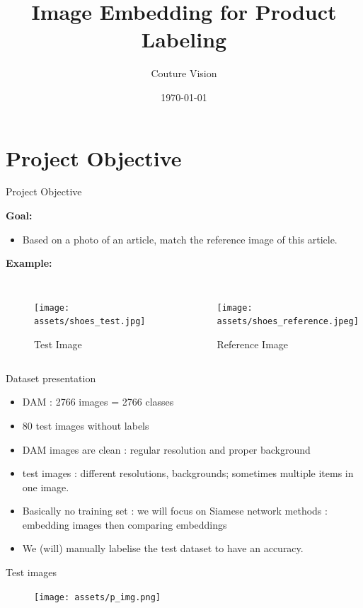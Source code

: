 \documentclass{beamer}
\title{Image Embedding for Product Labeling}
\author{Couture Vision}
\date{\today}
\begin{document}
\frame{\titlepage}

\section{Project Objective}
\begin{frame}{Project Objective}

\textbf{Goal:}
\begin{itemize}
    \item Based on a photo of an article, match the reference image of this article.
\end{itemize}

\textbf{Example:}
\begin{columns}
    \begin{figure}[t]
        \texttt{[image: assets/shoes\_test.jpg]}
        \caption{Test Image}
    \end{figure}
    \begin{figure}[t]
        \texttt{[image: assets/shoes\_reference.jpeg]}
        \caption{Reference Image}
    \end{figure}
\end{columns}

\end{frame}

\begin{frame}{Dataset presentation}
    \begin{itemize}
        \item DAM : 2766 images = 2766 classes
        \item 80 test images without labels
        \item DAM images are clean : regular resolution and proper background
        \item test images : different resolutions, backgrounds; sometimes multiple items in one image.
        \item Basically no training set : we will focus on Siamese network methods : embedding images then comparing embeddings
        \item We (will) manually labelise the test dataset to have an accuracy.
    \end{itemize}
    \end{frame}
    
    \begin{frame}{Test images}
        \begin{figure}
            \texttt{[image: assets/p\_img.png]}
        \end{figure}
    \end{frame}
\end{document}
